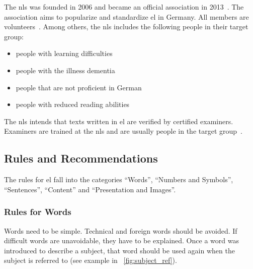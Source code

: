 The \gls{nls} was founded in 2006 and became an official association in 2013~\autocite{netzwerkHistory}.
The association aims to popularize and standardize \gls{el} in Germany.
All members are volunteers~\autocite{netzwerkGoals}.
Among others, the \gls{nls} includes the following people in their target group:
\begin{itemize}[noitemsep]
    \item people with learning difficulties
    \item people with the illness dementia
    \item people that are not proficient in German
    \item people with reduced reading abilities
\end{itemize}
The \gls{nls} intends that texts written in \gls{el} are verified by certified examiners.
Examiners are trained at the \gls{nls} and are usually people in the target group~\autocite{netzwerkPruef}.

\subsection{Rules and Recommendations}\label{subsec:el-rules}
The rules for \gls{el} fall into the categories \enquote{Words}, \enquote{Numbers and Symbols}, \enquote{Sentences}, \enquote{Content} and \enquote{Presentation and Images}.

\subsubsection{Rules for Words}
Words need to be simple.
Technical and foreign words should be avoided.
If difficult words are unavoidable, they have to be explained.
Once a word was introduced to describe a subject, that word should be used again when the subject is referred to (see example in ~\autoref{fig:subject_ref}).

